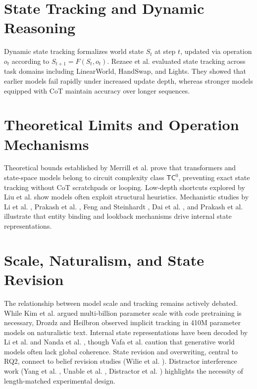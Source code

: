 \documentclass{iutbscthesis}
\begin{document}
\section{State Tracking and Dynamic Reasoning}
Dynamic state tracking formalizes world state $S_t$ at step $t$, updated via operation $o_t$ according to $S_{t+1} = F(S_t, o_t)$. Rezaee et al. \cite{rezaee2025exploring} evaluated state tracking across task domains including LinearWorld, HandSwap, and Lights. They showed that earlier models fail rapidly under increased update depth, whereas stronger models equipped with CoT maintain accuracy over longer sequences.

\section{Theoretical Limits and Operation Mechanisms}
Theoretical bounds established by Merrill et al. \cite{merrill2024illusion} prove that transformers and state-space models belong to circuit complexity class $\mathsf{TC}^0$, preventing exact state tracking without CoT scratchpads or looping. Low-depth shortcuts explored by Liu et al. \cite{liu2023shortcuts} show models often exploit structural heuristics. Mechanistic studies by Li et al. \cite{li2025track}, Prakash et al. \cite{prakash2024finetuning}, Feng and Steinhardt \cite{feng2023bind}, Dai et al. \cite{dai2024binding}, and Prakash et al. \cite{prakash2025lookbacks} illustrate that entity binding and lookback mechanisms drive internal state representations.

\section{Scale, Naturalism, and State Revision}
The relationship between model scale and tracking remains actively debated. While Kim et al. \cite{kim2024code} argued multi-billion parameter scale with code pretraining is necessary, Drozdz and Heilbron \cite{drozdz2026entity} observed implicit tracking in 410M parameter models on naturalistic text. Internal state representations have been decoded by Li et al. \cite{li2022emergent} and Nanda et al. \cite{nanda2023emergent}, though Vafa et al. \cite{vafa2024worldmodel} caution that generative world models often lack global coherence. State revision and overwriting, central to RQ2, connect to belief revision studies (Wilie et al. \cite{wilie2024belief}). Distractor interference work (Yang et al. \cite{yang2025gsmdc}, Unable et al. \cite{unable2025forget}, Distractor et al. \cite{distractor2026truncation}) highlights the necessity of length-matched experimental design.
\end{document}
